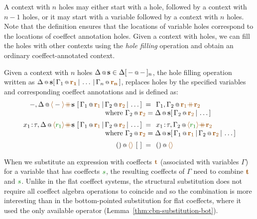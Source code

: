 \noindent
A context with $n$ holes may either start with a hole, followed by a context with $n-1$ holes, or it may
start with a variable followed by a context with $n$ holes. Note that the definition ensures that
the locations of variable holes correspond to the locations of coeffect annotation holes. Given a context
with holes, we can fill the holes with other contexts using the \emph{hole filling} operation and
obtain an ordinary coeffect-annotated context.

\begin{definition} Given a context with $n$ holes $\coctx{\Delta}{\textbf{s}} \in
\Delta[\,\coctx{-}{-}\,]_n$, the hole filling operation written as
$\coctx{\Delta}{\textbf{s}}[\,\coctx{\Gamma_1}{\aclrd{\mathbf{r_1}}} \,|\, \ldots \,|\, \coctx{\Gamma_n}{\aclrd{\mathbf{r_n}}} \,]$,
replaces holes by the specified variables and corresponding coeffect annotations and is defined as:
%
\begin{equation*}
\begin{array}{rcl}
 \coctx{-, \Delta}{\alift{-} \atimes \textbf{s} }
    ~[\,\coctx{\Gamma_1}{\aclrd{\textbf{r}_1}} \,|\, \coctx{\Gamma_2}{\aclrd{\textbf{r}_2}} \,|\, \ldots \,] &\narrow{=}&
      \coctx{\Gamma_1, \Gamma_2}{\aclrd{\textbf{r}_1} \atimes \aclrd{\textbf{r}_2} } \\
 && \qquad \hspace{-9.3em} \textnormal{where}~\coctx{\Gamma_2}{\aclrd{\textbf{r}_2}} =
     \coctx{\Delta}{\textbf{s}}[\, \coctx{\Gamma_2}{\aclrd{\textbf{r}_2}} \,|\, \ldots \,]
\\[0.5em]
 \coctx{x_1\!:\!\tau, \Delta}{\alift{\cclrd{r_1}} \atimes \textbf{s} }
    ~[\,\coctx{\Gamma_1}{\aclrd{\textbf{r}_1}} \,|\, \coctx{\Gamma_2}{\aclrd{\textbf{r}_2}} \,|\, \ldots \,] &\narrow{=}&
      \coctx{x_1\!:\!\tau, \Gamma_2}{\alift{\cclrd{r_1}} \atimes \aclrd{\textbf{r}_2} } \\
 && \qquad \hspace{-9.3em} \textnormal{where}~\coctx{\Gamma_2}{\aclrd{\textbf{r}_2}} =
     \coctx{\Delta}{\textbf{s}}[\,\coctx{\Gamma_1}{\aclrd{\textbf{r}_1}} \,|\, \coctx{\Gamma_2}{\aclrd{\textbf{r}_2}} \,|\, \ldots \,]
\\[0.5em]
 \coctx{()}{\alift{}}~[~] &\narrow{=}& \coctx{()}{\alift{}}
\end{array}
\end{equation*}
\end{definition}

\noindent
When we substitute an expression with coeffects $\aclrd{\textbf{t}}$ (associated with variables $\Gamma$)
for a variable that has coeffects $\cclrd{s}$, the resulting coeffects of $\Gamma$ need to
combine $\aclrd{\textbf{t}}$ and $\cclrd{s}$. Unlike in the flat coeffect systems, the structural
substitution does not require all coeffect algebra operations to coincide and so the combination
is more interesting than in the bottom-pointed substitution for flat coeffects, where it used
the only available operator (Lemma~\ref{thm:cbn-substitution-bot}).

